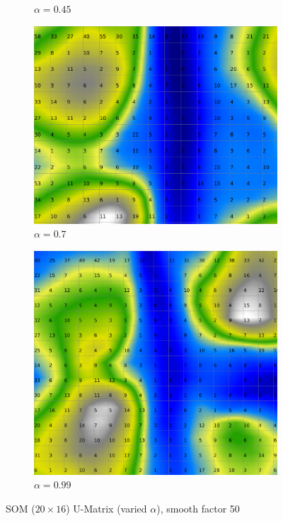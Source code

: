 \documentclass{acm_proc_article-sp}
\begin{document}
\begin{figure}
\begin{subfigure}[b]{0.24\linewidth}
        \caption{$\alpha=0.45$}
        \label{fig:wine-20x16-smoothed-data-histogram-alpha-0,45-f-50}
    \end{subfigure}
    \begin{subfigure}[b]{0.24\linewidth}
        \includegraphics[width=\linewidth]{img/wine-20x16-smoothed-data-histogram-alpha-0,7-f-50}
        \caption{$\alpha=0.7$}
        \label{fig:wine-20x16-smoothed-data-histogram-alpha-0,7-f-50}
    \end{subfigure}
    \begin{subfigure}[b]{0.24\linewidth}
        \includegraphics[width=\linewidth]{img/wine-20x16-smoothed-data-histogram-alpha-0,99-f-50}
        \caption{$\alpha=0.99$}
        \label{fig:wine-20x16-smoothed-data-histogram-alpha-0,99-f-50}
    \end{subfigure}
    \caption{SOM ($20\times16$) U-Matrix (varied $\alpha$), smooth factor 50}
    \label{fig:wine-20x16-smoothed-data-histogram-alpha-f-50}
\end{figure}
\end{document}
